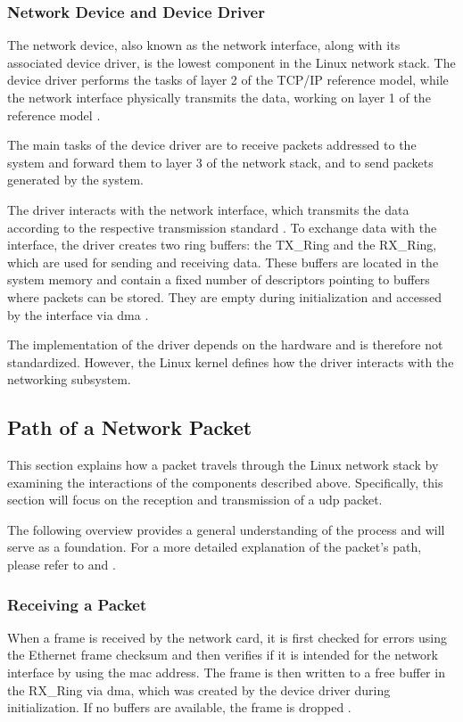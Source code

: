 \subsubsection{Network Device and Device Driver}
The network device, also known as the network interface, along with its associated device driver, is the lowest component in the Linux network stack. The device driver performs the tasks of layer 2 of the TCP/IP reference model, while the network interface physically transmits the data, working on layer 1 of the reference model \cite{lins01}.

The main tasks of the device driver are to receive packets addressed to the system and forward them to layer 3 of the network stack, and to send packets generated by the system.

The driver interacts with the network interface, which transmits the data according to the respective transmission standard \cite{lins01}. To exchange data with the interface, the driver creates two ring buffers: the TX\_Ring and the RX\_Ring, which are used for sending and receiving data. These buffers are located in the system memory and contain a fixed number of descriptors pointing to buffers where packets can be stored. They are empty during initialization and accessed by the interface via \ac{dma} \cite{lins03, lins14}.

The implementation of the driver depends on the hardware and is therefore not standardized. However, the Linux kernel defines how the driver interacts with the networking subsystem.

\subsection{Path of a Network Packet} \label{chap:sedrecpath}
This section explains how a packet travels through the Linux network stack by examining the interactions of the components described above. Specifically, this section will focus on the reception and transmission of a \ac{udp} packet.

The following overview provides a general understanding of the process and will serve as a foundation. For a more detailed explanation of the packet's path, please refer to \cite{lins01} and \cite{lins06}.

\subsubsection{Receiving a Packet} \label{chap:recpath}
When a frame is received by the network card, it is first checked for errors using the Ethernet frame checksum and then verifies if it is intended for the network interface by using the \ac{mac} address. The frame is then written to a free buffer in the RX\_Ring via \ac{dma}, which was created by the device driver during initialization. If no buffers are available, the frame is dropped \cite{lins03, lins06, lins14}.

